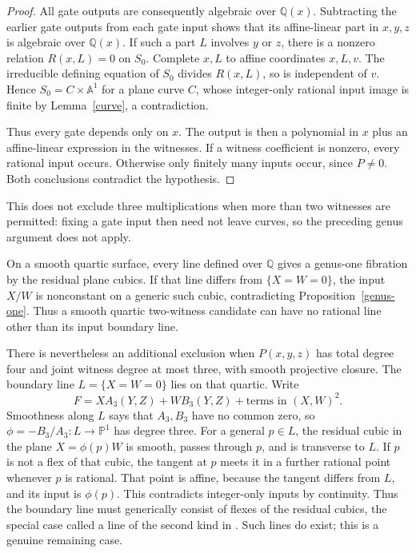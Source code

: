 \documentclass[11pt]{article}
\theoremstyle{remark}\newtheorem{remark}[theorem]{Remark}
\newcommand{\Q}{\mathbb Q}\newcommand{\Z}{\mathbb Z}\newcommand{\R}{\mathbb R}
\newcommand{\A}{\mathbb A}\newcommand{\PP}{\mathbb P}\newcommand{\Gm}{\mathbb G_m}
\begin{document}
\begin{proof}
All gate outputs are consequently algebraic over \(\Q(x)\). Subtracting the earlier gate outputs from each gate input shows that its affine-linear part in \(x,y,z\) is algebraic over \(\Q(x)\). If such a part \(L\) involves \(y\) or \(z\), there is a nonzero relation \(R(x,L)=0\) on \(S_0\). Complete \(x,L\) to affine coordinates \(x,L,v\). The irreducible defining equation of \(S_0\) divides \(R(x,L)\), so is independent of \(v\). Hence \(S_0=C\times\A^1\) for a plane curve \(C\), whose integer-only rational input image is finite by Lemma~\ref{curve}, a contradiction.

Thus every gate depends only on \(x\). The output is then a polynomial in \(x\) plus an affine-linear expression in the witnesses. If a witness coefficient is nonzero, every rational input occurs. Otherwise only finitely many inputs occur, since \(P\ne0\). Both conclusions contradict the hypothesis.
\end{proof}

This does not exclude three multiplications when more than two witnesses are permitted: fixing a gate input then need not leave curves, so the preceding genus argument does not apply.

On a smooth quartic surface, every line defined over \(\Q\) gives a genus-one fibration by the residual plane cubics. If that line differs from \(\{X=W=0\}\), the input \(X/W\) is nonconstant on a generic such cubic, contradicting Proposition~\ref{genus-one}. Thus a smooth quartic two-witness candidate can have no rational line other than its input boundary line.

There is nevertheless an additional exclusion when \(P(x,y,z)\) has total degree four and joint witness degree at most three, with smooth projective closure. The boundary line \(L=\{X=W=0\}\) lies on that quartic. Write
\[
 F=X A_3(Y,Z)+W B_3(Y,Z)+\text{terms in }(X,W)^2.
\]
Smoothness along \(L\) says that \(A_3,B_3\) have no common zero, so \(\phi=-B_3/A_3:L\to\PP^1\) has degree three. For a general \(p\in L\), the residual cubic in the plane \(X=\phi(p)W\) is smooth, passes through \(p\), and is transverse to \(L\). If \(p\) is not a flex of that cubic, the tangent at \(p\) meets it in a further rational point whenever \(p\) is rational. That point is affine, because the tangent differs from \(L\), and its input is \(\phi(p)\). This contradicts integer-only inputs by continuity. Thus the boundary line must generically consist of flexes of the residual cubics, the special case called a line of the second kind in \cite[Sections 2--3]{RS}. Such lines do exist; this is a genuine remaining case.
\end{document}
